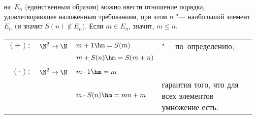 
    на~$E_n$ (единственным образом) можно ввести отношение порядка,
     удовлетворяющее наложенным требованиям, при этом $n$ "--- наибольший элемент $E_n$ $\big($и значит $S(n)\nin E_n\big)$.
      Если $m\in E_n$, значит, $m\leq n$.

    \begin{tabular}{rlll}
        $(+)\colon$&$\N^2\to\N$&$m+1\hm=S(m)$&"--- по~определению;\\
               &         &$m+S(n)\hm=S(m+n)$\\ \\
        $(\cdot)\colon$&$\N^2\to\N$&$m\cdot1\hm=m$\\
        & &$m\cdot S(n)\hm=mn+m$&гарантия того, что для всех элементов умножение есть.
    \end{tabular}
